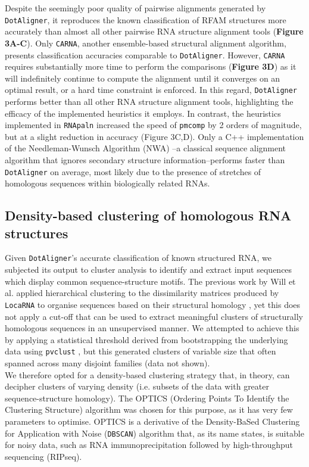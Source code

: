\documentclass[a4paper,11pt]{article}
\newcommand\dotaligner{\texttt{DotAligner}}
\newcommand\locarna{\texttt{LocaRNA}}
\newcommand\carna{\texttt{CARNA}}
\begin{document}
Despite the seemingly poor quality of pairwise alignments generated by \dotaligner{}, it 
reproduces the known classification of RFAM structures more accurately than almost all 
other pairwise RNA structure alignment tools (\textbf{Figure 3A-C}). Only \carna{}, 
another ensemble-based structural alignment algorithm, presents classification accuracies
comparable to \dotaligner{}. However,  \carna{} requires substantially more time to perform 
the comparisons (\textbf{Figure 3D}) as it will indefinitely continue to compute the alignment
until it converges on an optimal result, or a hard time constraint is enforced.  In this regard, 
\dotaligner{} performs better than all other RNA structure alignment tools, highlighting 
the efficacy of the implemented  heuristics it employs. In contrast, the heuristics implemented 
in \texttt{RNApaln} increased the speed of \texttt{pmcomp} by 2 orders of magnitude, but
at a slight reduction in accuracy (Figure 3C,D). Only a C++ implementation of the 
Needleman-Wunsch Algorithm (NWA) \cite{needleman1970general}--a classical 
sequence alignment algorithm that ignores secondary structure information--performs 
faster than \dotaligner{} on average, most likely due to the presence of stretches of 
homologous sequences within biologically related RNAs.  \\

\subsection*{ Density-based clustering of homologous RNA structures }

Given \dotaligner{}'s accurate classification of known structured RNA, we subjected its
output to cluster analysis to identify and extract input sequences which display common
sequence-structure motifs. The previous work by Will et al. applied hierarchical clustering 
to the dissimilarity matrices produced by \locarna{} to organise sequences based on their
structural homology \cite{Will17432929}, yet this does not apply a cut-off that can be used 
to extract meaningful clusters of structurally homologous sequences in an unsupervised 
manner. We attempted to achieve this by applying a statistical threshold derived from 
bootstrapping the underlying data using \texttt{pvclust} \cite{suzuki2006pvclust}, but this
generated clusters of variable size that often spanned across many disjoint families 
(data not shown).\\

We therefore opted for a density-based clustering strategy that, in theory, can decipher 
clusters of varying density (i.e. subsets of the data with greater sequence-structure homology). 
The OPTICS (Ordering Points To Identify the Clustering Structure) algorithm \cite{ankerst99ordering}
was chosen for this purpose, as it has very few parameters to optimise. 
OPTICS is a derivative of the Density-BaSed Clustering for Application with Noise
 (\texttt{DBSCAN}) \cite{ester1996density} algorithm that, as its name states, is suitable 
 for noisy data, such as RNA immunoprecipitation followed by high-throughput sequencing 
 (RIPseq).\\
\end{document}
